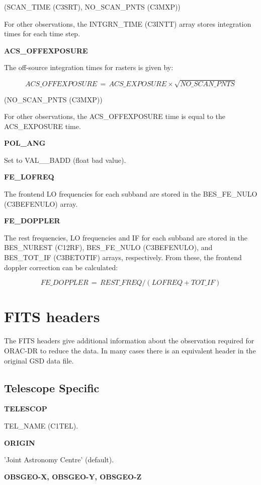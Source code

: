 \documentclass[twoside,11pt,nolof]{starlink}
\providecommand{\telName}{TEL\_NAME (C1TEL)}
\providecommand{\scanTime}{SCAN\_TIME (C3SRT)}
\providecommand{\nScanPts}{NO\_SCAN\_PNTS (C3MXP)}
\providecommand{\restFreqs}{BES\_NUREST (C12RF)}
\providecommand{\LOFreqs}{BES\_FE\_NULO (C3BEFENULO)}
\providecommand{\totIFs}{BES\_TOT\_IF (C3BETOTIF)}
\providecommand{\intTimes}{INTGRN\_TIME (C3INTT)}
\begin{document}
(\scanTime, \nScanPts)

For other observations, the \intTimes{} array stores integration times for each time step.

\textbf{ACS\_OFFEXPOSURE}

The off-source integration times for rasters is given by:

\begin{equation}
ACS\_OFFEXPOSURE \,=\, ACS\_EXPOSURE\times\sqrt{NO\_SCAN\_PNTS}
\end{equation}

(\nScanPts)

For other observations, the ACS\_OFFEXPOSURE time is equal to the ACS\_EXPOSURE time.

\textbf{POL\_ANG}

Set to VAL\_\_BADD (float bad value).

\textbf{FE\_LOFREQ}

The frontend LO frequencies for each subband are stored in the \LOFreqs{} array.

\textbf{FE\_DOPPLER}

The rest frequencies, LO frequencies and IF for each subband are stored in the \restFreqs, \LOFreqs, and \totIFs{} arrays, respectively.  From these, the frontend doppler correction can be calculated:

\begin{equation}
FE\_DOPPLER \,=\, REST\_FREQ / \left(LOFREQ + TOT\_IF\right)
\end{equation}

\section{FITS headers}

The FITS headers give additional information about the observation required for ORAC-DR to reduce the data.  In many cases there is an equivalent header in the original GSD data file.

\subsection{Telescope Specific}

\textbf{TELESCOP}

\telName.

\textbf{ORIGIN}

'Joint Astronomy Centre' (default).

\textbf{OBSGEO-X, OBSGEO-Y, OBSGEO-Z}
\end{document}
